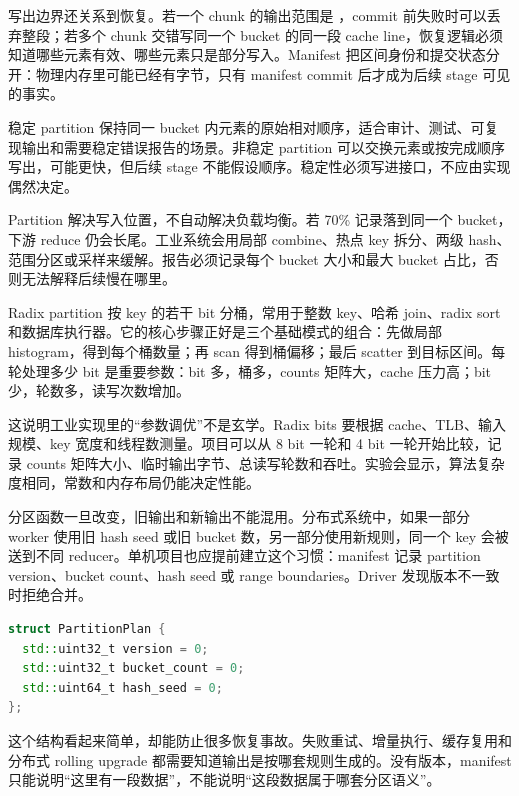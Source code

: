 写出边界还关系到恢复。若一个 chunk 的输出范围是 \code{[begin, end)}，commit 前失败时可以丢弃整段；若多个 chunk 交错写同一个 bucket 的同一段 cache line，恢复逻辑必须知道哪些元素有效、哪些元素只是部分写入。Manifest 把区间身份和提交状态分开：物理内存里可能已经有字节，只有 manifest commit 后才成为后续 stage 可见的事实。

稳定 partition 保持同一 bucket 内元素的原始相对顺序，适合审计、测试、可复现输出和需要稳定错误报告的场景。非稳定 partition 可以交换元素或按完成顺序写出，可能更快，但后续 stage 不能假设顺序。稳定性必须写进接口，不应由实现偶然决定。

Partition 解决写入位置，不自动解决负载均衡。若 70\% 记录落到同一个 bucket，下游 reduce 仍会长尾。工业系统会用局部 combine、热点 key 拆分、两级 hash、范围分区或采样来缓解。报告必须记录每个 bucket 大小和最大 bucket 占比，否则无法解释后续慢在哪里。

Radix partition 按 key 的若干 bit 分桶，常用于整数 key、哈希 join、radix sort 和数据库执行器。它的核心步骤正好是三个基础模式的组合：先做局部 histogram，得到每个桶数量；再 scan 得到桶偏移；最后 scatter 到目标区间。每轮处理多少 bit 是重要参数：bit 多，桶多，counts 矩阵大，cache 压力高；bit 少，轮数多，读写次数增加。

这说明工业实现里的“参数调优”不是玄学。Radix bits 要根据 cache、TLB、输入规模、key 宽度和线程数测量。项目可以从 8 bit 一轮和 4 bit 一轮开始比较，记录 counts 矩阵大小、临时输出字节、总读写轮数和吞吐。实验会显示，算法复杂度相同，常数和内存布局仍能决定性能。

分区函数一旦改变，旧输出和新输出不能混用。分布式系统中，如果一部分 worker 使用旧 hash seed 或旧 bucket 数，另一部分使用新规则，同一个 key 会被送到不同 reducer。单机项目也应提前建立这个习惯：manifest 记录 partition version、bucket count、hash seed 或 range boundaries。Driver 发现版本不一致时拒绝合并。

\begin{lstlisting}[language=C++,caption={PartitionPlan 记录分区规则身份}]
struct PartitionPlan {
  std::uint32_t version = 0;
  std::uint32_t bucket_count = 0;
  std::uint64_t hash_seed = 0;
};
\end{lstlisting}

这个结构看起来简单，却能防止很多恢复事故。失败重试、增量执行、缓存复用和分布式 rolling upgrade 都需要知道输出是按哪套规则生成的。没有版本，manifest 只能说明“这里有一段数据”，不能说明“这段数据属于哪套分区语义”。

